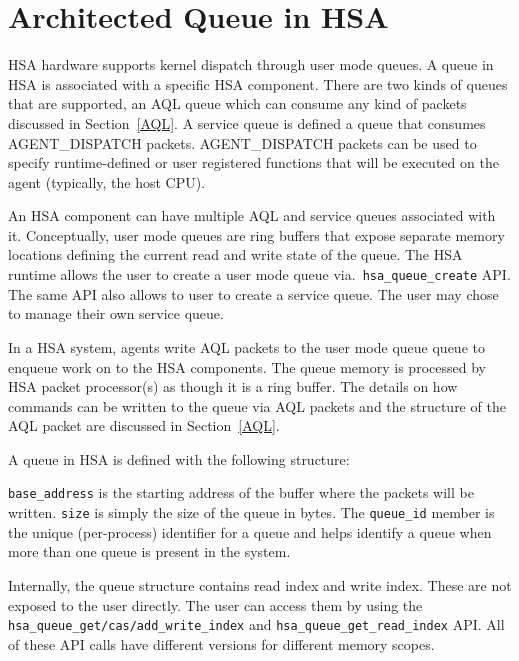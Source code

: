 \documentclass{book}
\begin{document}
\hypertarget{architected\_queue}{} \section{Architected Queue in
H\-S\-A} \label{architected_queue}

H\-S\-A hardware supports kernel dispatch through user mode queues.
A queue in HSA is associated with a specific HSA component. There
are two kinds of queues that are supported, an AQL queue which can
consume any kind of packets discussed in Section~\ref{AQL}. A
service queue is defined a queue that consumes AGENT\_DISPATCH
packets. AGENT\_DISPATCH packets can be used to specify
runtime-defined or user registered functions that will be executed
on the agent (typically, the host CPU).

An HSA component can have multiple AQL and service queues associated
with it.  Conceptually, user mode queues are ring buffers that
expose separate memory locations defining the current read and write
state of the queue. The HSA runtime allows the user to create a user
mode queue via.\ \texttt{hsa\_queue\_create} API. The same API also
allows to user to create a service queue. The user may chose to
manage their own service queue.

In a HSA system, agents write AQL packets to the user mode queue
queue to enqueue work on to the HSA components. The queue memory is
processed by HSA packet processor(s) as though it is a ring buffer.
The details on how commands can be written to the queue via AQL
packets and the structure of the AQL packet are discussed in
Section~\ref{AQL}.


A queue in HSA is defined with the following structure:



\texttt{base\_address} is the starting address of the buffer where
the packets will be written.  \texttt{size} is simply the size of
the queue in bytes.  The \texttt{queue\-\_\-id} member is the unique
(per-process) identifier for a queue and helps identify a queue when
more than one queue is present in the system.

Internally, the queue structure contains read index and write index.
These are not exposed to the user directly. The user can access them
by using the \texttt{hsa\_queue\_get/cas/add\_write\_index} and
\texttt{hsa\_queue\_get\_read\_index} API. All of these API calls
have different versions for different memory scopes.
\end{document}
